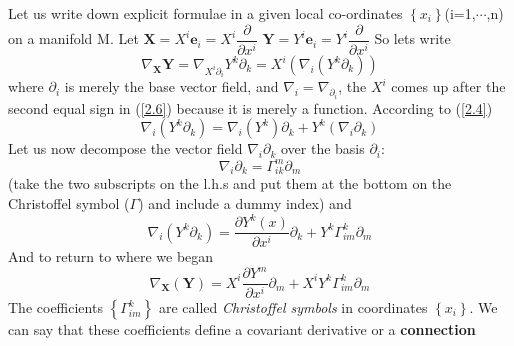 \documentclass[a4paper,10pt]{article}
\newcommand{\christoffel}[3][i]{\ensuremath{\Gamma_{#1#2}^{#3}}}
\begin{document}
Let us write down explicit formulae in a given local co-ordinates $\left\lbrace x_i \right\rbrace$(i=1,$\cdots$,n)
on a manifold M. 
Let 
$\mathbf{X} = X^i\mathbf{e}_{i}= X^{i}\dfrac{\partial}{\partial x^{i}}$
$\mathbf{Y} = Y^i\mathbf{e}_{i} = Y^i \dfrac{\partial}{\partial x^i}$
So lets write 
\begin{equation}\label{2.6}
 \nabla_{\mathbf{X}}\mathbf{Y} = \nabla_{X^i\partial_i}Y^k\partial_k = X^{i}\left(\nabla_i\left(Y^k\partial_k\right)\right)
\end{equation}
where $\partial_i$ is merely the base vector field, and 
$\nabla_i = \nabla_{\partial_{i}}$, the $X^{i}$ comes up after the second equal sign in (\ref{2.6}) because it is merely
a function. According to (\ref{2.4})
\begin{equation}
 \nabla_i(Y^k \partial_k) = \nabla_i(Y^k)\partial_k + Y^k(\nabla_i \partial_k)
\end{equation}
Let us now decompose the vector field $\nabla_i \partial_k$ over the basis $\partial_i$:
\begin{equation}\label{2.7}
 \nabla_i \partial_k = \christoffel{k}{m} \partial_m
\end{equation}
(take the two subscripts on the l.h.s and put them at the bottom on the Christoffel symbol ($\Gamma$) and include a 
dummy index)
and 
\begin{equation}\label{2.8}
 \nabla_i(Y^k \partial_k) = \dfrac{\partial Y^{k}(x)}{\partial x^{i}}\partial_{k} + Y^{k}\christoffel{m}{k} \partial_m
\end{equation}
And to return to where we began
\begin{equation}\label{2.9}
 \nabla_{\mathbf{X}}(\mathbf{Y}) = X^{i}\dfrac{\partial Y^{m}}{\partial x^{i}}\partial_{m} + 
 X^{i}Y^{k}\christoffel{m}{k} \partial_m
\end{equation}
The coefficients $\left\lbrace \christoffel{m}{k}\right\rbrace$ are called \textit{Christoffel symbols} in coordinates
$\left\lbrace x_i \right\rbrace$. We can say that these coefficients define a covariant derivative or a \textbf{connection} 
\end{document}
